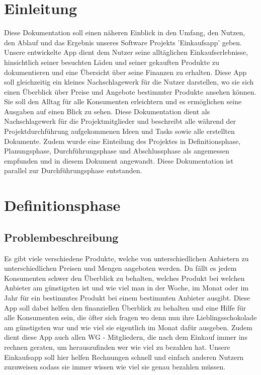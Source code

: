 \documentclass[12pt,a4paper]{article}
\begin{document}
\section*{Einleitung}
Diese Dokumentation soll einen näheren Einblick in den Umfang, 
den Nutzen, den Ablauf und das Ergebnis unseres Software Projekts 'Einkaufsapp' geben.  
\newline
Unsere entwickelte App dient dem Nutzer seine alltäglichen Einkaufserlebnisse, hinsichtlich seiner besuchten Läden und seiner gekauften Produkte zu dokumentieren und eine Übersicht über seine Finanzen zu erhalten.
Diese App soll gleichzeitig ein kleines Nachschlagewerk für die Nutzer darstellen, wo sie sich einen Überblick über Preise und Angebote bestimmter Produkte ansehen können. Sie soll den Alltag für alle Konsumenten erleichtern und es ermöglichen seine Ausgaben auf einen Blick zu sehen.
\newline
Diese Dokumentation dient als Nachschlagewerk für die Projektmitglieder und beschreibt alle während der Projektdurchführung aufgekommenen Ideen und Tasks sowie alle  erstellten Dokumente.
\newline
Zudem wurde eine Einteilung des Projektes in Definitionsphase, Planungsphase, Durchführungsphase und Abschlussphase als angemessen empfunden und in diesem Dokument angewandt.
Diese Dokumentation ist parallel zur Durchführungsphase entstanden.
\newline
\newpage
\section{Definitionsphase}
\subsection{Problembeschreibung}
Es gibt viele verschiedene Produkte, welche von unterschiedlichen Anbietern zu unterschiedlichen Preisen und Mengen angeboten werden. 
Da fällt es jedem Konsumenten schwer den Überblick zu behalten, welches Produkt bei welchen Anbieter am günstigsten ist und wie viel man in der Woche, im Monat oder im Jahr für ein bestimmtes Produkt bei einem bestimmten Anbieter ausgibt. Diese App soll dabei helfen den finanziellen Überblick zu behalten und eine Hilfe für alle Konsumenten sein, die öfter sich fragen wo denn nun ihre Lieblingsschokolade am günstigsten war und wie viel sie eigentlich im Monat dafür ausgeben. 
Zudem dient diese App auch allen WG - Mitgliedern, die nach dem Einkauf immer ins rechnen geraten, um herauszufinden wer wie viel zu bezahlen hat. Unsere Einkaufsapp soll hier helfen Rechnungen schnell und einfach anderen Nutzern zuzuweisen sodass sie immer wissen wie viel sie genau bezahlen müssen.
\end{document}
